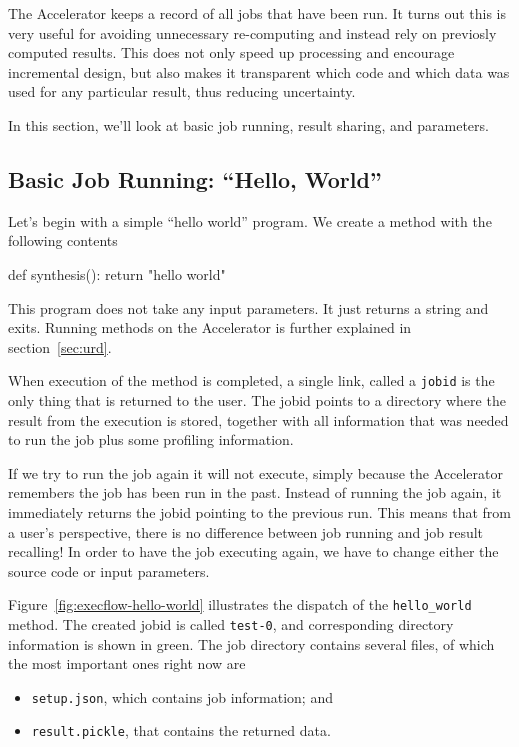 \documentclass[a4paper]{article}
\begin{document}
The Accelerator keeps a record of all jobs that have been run.  It
turns out this is very useful for avoiding unnecessary re-computing
and instead rely on previosly computed results.  This does not only
speed up processing and encourage incremental design, but also makes
it transparent which code and which data was used for any particular
result, thus reducing uncertainty.

In this section, we'll look at basic job running, result sharing, and
parameters.


\subsection{Basic Job Running:  ``Hello, World''}

Let's begin with a simple ``hello world'' program.  We create a method
with the following contents
\begin{python}
def synthesis():
    return "hello world"
\end{python}
This program does not take any input parameters.  It just returns a
string and exits.  Running methods on the Accelerator is further
explained in section~\ref{sec:urd}.

When execution of the method is completed, a single link, called a
\texttt{jobid} is the only thing that is returned to the user.  The
jobid points to a directory where the result from the execution is
stored, together with all information that was needed to run the job
plus some profiling information.

If we try to run the job again it will not execute, simply because the
Accelerator remembers the job has been run in the past.  Instead of
running the job again, it immediately returns the jobid pointing to
the previous run.  This means that from a user's perspective, there is
no difference between job running and job result recalling!  In order
to have the job executing again, we have to change either the source
code or input parameters.

Figure~\ref{fig:execflow-hello-world} illustrates the dispatch of the
\texttt{hello\_world} method.  The created jobid is called
\texttt{test-0}, and corresponding directory information is shown in
green.  The job directory contains several files, of which the most
important ones right now are
\begin{itemize}
  \item[] \texttt{setup.json}, which contains job information; and
  \item[] \texttt{result.pickle}, that contains the returned data.
\end{itemize}
\end{document}
